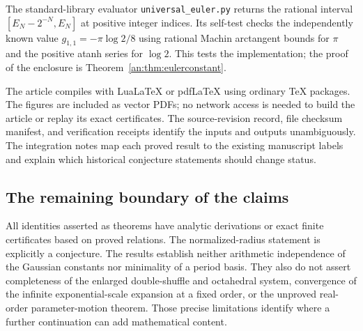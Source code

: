 \documentclass[11pt]{article}
\numberwithin{equation}{section}
\theoremstyle{plain}
\theoremstyle{definition}
\theoremstyle{remark}
\begin{document}
The standard-library evaluator \texttt{universal\_euler.py} returns
the rational interval $[E_N-2^{-N},E_N]$ at positive integer indices.
Its self-test checks the independently known value
$g_{1,1}=-\pi\log2/8$ using rational Machin arctangent bounds for
$\pi$ and the positive atanh series for $\log2$. This tests the
implementation; the proof of the enclosure is
Theorem~\ref{an:thm:eulerconstant}.

The article compiles with LuaLaTeX or pdfLaTeX using ordinary TeX
packages. The figures are included as vector PDFs; no network access
is needed to build the article or replay its exact certificates.
The source-revision record, file checksum manifest, and verification
receipts identify the inputs and outputs unambiguously. The integration
notes map each proved result to the existing manuscript labels and
explain which historical conjecture statements should change status.

\subsection{The remaining boundary of the claims}

All identities asserted as theorems have analytic derivations or exact
finite certificates based on proved relations. The normalized-radius
statement is explicitly a conjecture. The results establish neither
arithmetic independence of the Gaussian constants nor minimality of a
period basis. They also do not assert completeness of the enlarged
double-shuffle and octahedral system, convergence of the infinite
exponential-scale expansion at a fixed order, or the unproved real-order
parameter-motion theorem. Those precise limitations identify where a
further continuation can add mathematical content.
\end{document}
